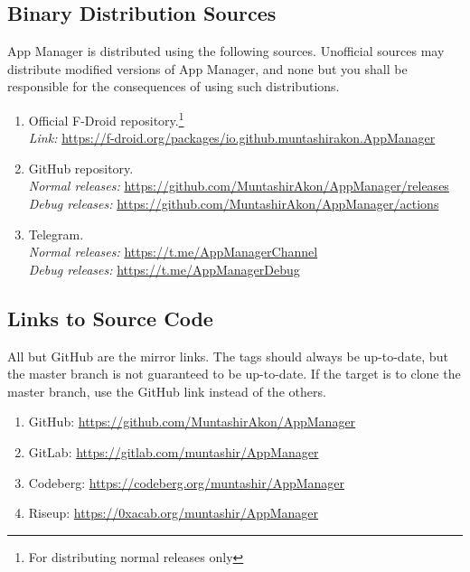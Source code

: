\subsection{Binary Distribution Sources}\label{subsec:binary-distribution-sources} %
App Manager is distributed using the following sources. Unofficial sources may distribute modified versions of App
Manager, and none but you shall be responsible for the consequences of using such distributions.
\begin{enumerate}
    \item Official F-Droid repository.\footnote{For distributing normal releases only}\\
    \textit{Link:} \url{https://f-droid.org/packages/io.github.muntashirakon.AppManager}
    \item GitHub repository.\\
    \textit{Normal releases:} \url{https://github.com/MuntashirAkon/AppManager/releases}\\
    \textit{Debug releases:} \url{https://github.com/MuntashirAkon/AppManager/actions}
    \item Telegram.\\
    \textit{Normal releases:} \url{https://t.me/AppManagerChannel}\\
    \textit{Debug releases:} \url{https://t.me/AppManagerDebug}
\end{enumerate}

\subsection{Links to Source Code}\label{subsec:links-to-source-code} %
All but GitHub are the mirror links. The tags should always be up-to-date, but the master branch is not guaranteed to be
up-to-date. If the target is to clone the master branch, use the GitHub link instead of the others.
\begin{enumerate}
    \item GitHub: \url{https://github.com/MuntashirAkon/AppManager}
    \item GitLab: \url{https://gitlab.com/muntashir/AppManager}
    \item Codeberg: \url{https://codeberg.org/muntashir/AppManager}
    \item Riseup: \url{https://0xacab.org/muntashir/AppManager}
\end{enumerate}


